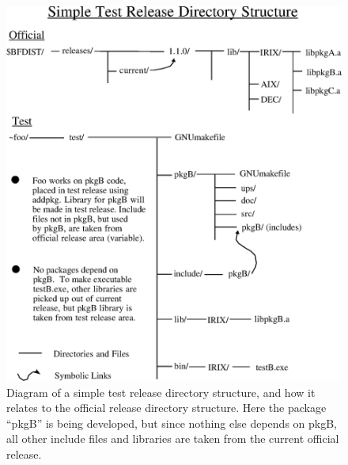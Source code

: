 \documentclass[12pt]{article}
\begin{document}
\begin{figure}[bht!]
\centerline{\includegraphics[width=5in]{run_2_dev_simple.eps}}
\caption[Simple Test Release Directory Structure]{ 
Diagram of a simple test release directory structure, and how it relates to the
official release directory structure.  Here the package ``pkgB'' is being
developed, but since nothing else depends on pkgB, all other include files
and libraries are taken from the current official release.}
\label{fig_dev_simple}
\end{figure}
\clearpage 
\end{document}
